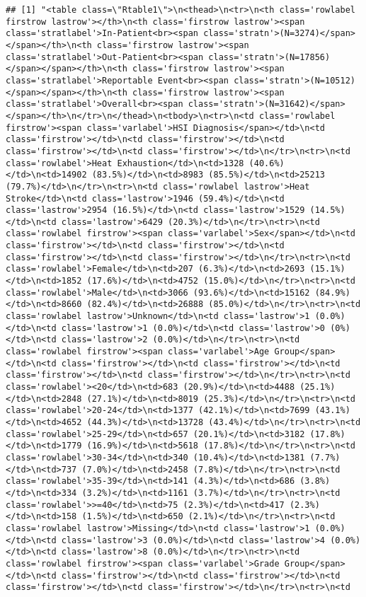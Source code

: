 \documentclass[
]{article}
\begin{document}
\begin{verbatim}
## [1] "<table class=\"Rtable1\">\n<thead>\n<tr>\n<th class='rowlabel firstrow lastrow'></th>\n<th class='firstrow lastrow'><span class='stratlabel'>In-Patient<br><span class='stratn'>(N=3274)</span></span></th>\n<th class='firstrow lastrow'><span class='stratlabel'>Out-Patient<br><span class='stratn'>(N=17856)</span></span></th>\n<th class='firstrow lastrow'><span class='stratlabel'>Reportable Event<br><span class='stratn'>(N=10512)</span></span></th>\n<th class='firstrow lastrow'><span class='stratlabel'>Overall<br><span class='stratn'>(N=31642)</span></span></th>\n</tr>\n</thead>\n<tbody>\n<tr>\n<td class='rowlabel firstrow'><span class='varlabel'>HSI Diagnosis</span></td>\n<td class='firstrow'></td>\n<td class='firstrow'></td>\n<td class='firstrow'></td>\n<td class='firstrow'></td>\n</tr>\n<tr>\n<td class='rowlabel'>Heat Exhaustion</td>\n<td>1328 (40.6%)</td>\n<td>14902 (83.5%)</td>\n<td>8983 (85.5%)</td>\n<td>25213 (79.7%)</td>\n</tr>\n<tr>\n<td class='rowlabel lastrow'>Heat Stroke</td>\n<td class='lastrow'>1946 (59.4%)</td>\n<td class='lastrow'>2954 (16.5%)</td>\n<td class='lastrow'>1529 (14.5%)</td>\n<td class='lastrow'>6429 (20.3%)</td>\n</tr>\n<tr>\n<td class='rowlabel firstrow'><span class='varlabel'>Sex</span></td>\n<td class='firstrow'></td>\n<td class='firstrow'></td>\n<td class='firstrow'></td>\n<td class='firstrow'></td>\n</tr>\n<tr>\n<td class='rowlabel'>Female</td>\n<td>207 (6.3%)</td>\n<td>2693 (15.1%)</td>\n<td>1852 (17.6%)</td>\n<td>4752 (15.0%)</td>\n</tr>\n<tr>\n<td class='rowlabel'>Male</td>\n<td>3066 (93.6%)</td>\n<td>15162 (84.9%)</td>\n<td>8660 (82.4%)</td>\n<td>26888 (85.0%)</td>\n</tr>\n<tr>\n<td class='rowlabel lastrow'>Unknown</td>\n<td class='lastrow'>1 (0.0%)</td>\n<td class='lastrow'>1 (0.0%)</td>\n<td class='lastrow'>0 (0%)</td>\n<td class='lastrow'>2 (0.0%)</td>\n</tr>\n<tr>\n<td class='rowlabel firstrow'><span class='varlabel'>Age Group</span></td>\n<td class='firstrow'></td>\n<td class='firstrow'></td>\n<td class='firstrow'></td>\n<td class='firstrow'></td>\n</tr>\n<tr>\n<td class='rowlabel'><20</td>\n<td>683 (20.9%)</td>\n<td>4488 (25.1%)</td>\n<td>2848 (27.1%)</td>\n<td>8019 (25.3%)</td>\n</tr>\n<tr>\n<td class='rowlabel'>20-24</td>\n<td>1377 (42.1%)</td>\n<td>7699 (43.1%)</td>\n<td>4652 (44.3%)</td>\n<td>13728 (43.4%)</td>\n</tr>\n<tr>\n<td class='rowlabel'>25-29</td>\n<td>657 (20.1%)</td>\n<td>3182 (17.8%)</td>\n<td>1779 (16.9%)</td>\n<td>5618 (17.8%)</td>\n</tr>\n<tr>\n<td class='rowlabel'>30-34</td>\n<td>340 (10.4%)</td>\n<td>1381 (7.7%)</td>\n<td>737 (7.0%)</td>\n<td>2458 (7.8%)</td>\n</tr>\n<tr>\n<td class='rowlabel'>35-39</td>\n<td>141 (4.3%)</td>\n<td>686 (3.8%)</td>\n<td>334 (3.2%)</td>\n<td>1161 (3.7%)</td>\n</tr>\n<tr>\n<td class='rowlabel'>>=40</td>\n<td>75 (2.3%)</td>\n<td>417 (2.3%)</td>\n<td>158 (1.5%)</td>\n<td>650 (2.1%)</td>\n</tr>\n<tr>\n<td class='rowlabel lastrow'>Missing</td>\n<td class='lastrow'>1 (0.0%)</td>\n<td class='lastrow'>3 (0.0%)</td>\n<td class='lastrow'>4 (0.0%)</td>\n<td class='lastrow'>8 (0.0%)</td>\n</tr>\n<tr>\n<td class='rowlabel firstrow'><span class='varlabel'>Grade Group</span></td>\n<td class='firstrow'></td>\n<td class='firstrow'></td>\n<td class='firstrow'></td>\n<td class='firstrow'></td>\n</tr>\n<tr>\n<td 
\end{verbatim}
\end{document}
